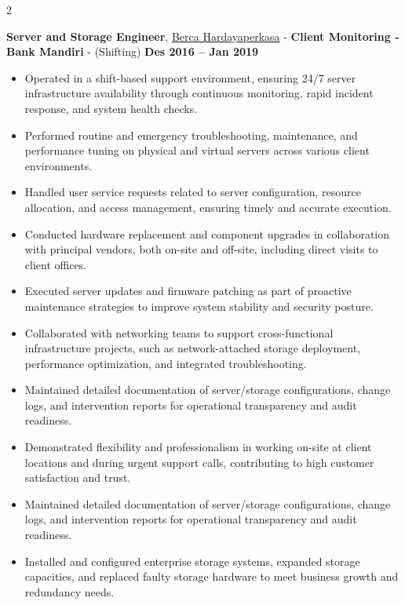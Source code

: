 \documentclass[10pt, letterpaper]{article}
\newenvironment{highlights}{
    \begin{itemize}[
        topsep=0.10 cm,
        parsep=0.10 cm,
        partopsep=0pt,
        itemsep=0pt,
        leftmargin=0 cm + 10pt
    ]
}{
    \end{itemize}
} %
\newenvironment{twocolentry}[2][]{
    \onecolentry
    \def\secondColumn{#2}
    \setcolumnwidth{\fill, 4.5 cm}
    \begin{paracol}{2}
}{
    \switchcolumn \raggedleft \secondColumn
    \end{paracol}
    \endonecolentry
} %
\let\hrefWithoutArrow\href
\begin{document}
		\begin{twocolentry}{\textbf{Des 2016 – Jan 2019}}
			\textbf{Server and Storage Engineer}, \hrefWithoutArrow{https://berca.co.id/}{Berca Hardayaperkasa} - \textbf{Client Monitoring - Bank Mandiri} -  (Shifting)\end{twocolentry}
		
		\vspace{0.1 cm}
		\begin{justify}
			
			\begin{highlights}
			\item Operated in a shift-based support environment, ensuring 24/7 server infrastructure availability through continuous monitoring, rapid incident response, and system health checks.
			
			\item Performed routine and emergency troubleshooting, maintenance, and performance tuning on physical and virtual servers across various client environments.
			
			\item Handled user service requests related to server configuration, resource allocation, and access management, ensuring timely and accurate execution.
			
			\item Conducted hardware replacement and component upgrades in collaboration with principal vendors, both on-site and off-site, including direct visits to client offices.
			
			\item Executed server updates and firmware patching as part of proactive maintenance strategies to improve system stability and security posture.
			
			\item Collaborated with networking teams to support cross-functional infrastructure projects, such as network-attached storage deployment, performance optimization, and integrated troubleshooting.
			
			\item Maintained detailed documentation of server/storage configurations, change logs, and intervention reports for operational transparency and audit readiness.
            
			\item Demonstrated flexibility and professionalism in working on-site at client locations and during urgent support calls, contributing to high customer satisfaction and trust.
			
			\item Maintained detailed documentation of server/storage configurations, change logs, and intervention reports for operational transparency and audit readiness.
			
			\item Installed and configured enterprise storage systems, expanded storage capacities, and replaced faulty storage hardware to meet business growth and redundancy needs.
				
			\end{highlights}
		\end{justify}
        \vspace{0.15 cm}
\end{document}
